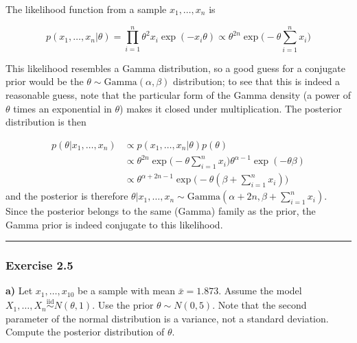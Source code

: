 \documentclass[
  letterpaper,
  DIV=11,
  numbers=noendperiod]{scrartcl}
\begin{document}
\begin{tcolorbox}[enhanced jigsaw, coltitle=black, breakable, colbacktitle=quarto-callout-note-color!10!white, colframe=quarto-callout-note-color-frame, bottomrule=.15mm, toprule=.15mm, rightrule=.15mm, arc=.35mm, colback=white, opacityback=0, bottomtitle=1mm, leftrule=.75mm, title={Solution}, titlerule=0mm, toptitle=1mm, left=2mm, opacitybacktitle=0.6]

The likelihood function from a sample \(x_1,\ldots,x_n\) is

\[
p(x_1,\ldots,x_n \vert \theta) = \prod_{i=1}^n\theta^2 x_i \exp (-x_i\theta) \propto \theta^{2n}\exp\Big(-\theta \sum_{i=1}^n x_i \Big)
\]

This likelihood resembles a Gamma distribution, so a good guess for a
conjugate prior would be the
\(\theta \sim \mathrm{Gamma}(\alpha,\beta)\) distribution; to see that
this is indeed a reasonable guess, note that the particular form of the
Gamma density (a power of \(\theta\) times an exponential in \(\theta\))
makes it closed under multiplication. The posterior distribution is then

\[
\begin{align}
p(\theta|x_1,\ldots,x_n) & \propto p(x_1,\ldots,x_n \vert \theta)p(\theta) \\
      & \propto \theta^{2n}\exp\Big(-\theta \sum_{i=1}^n x_i \Big)\theta^{\alpha-1}\exp(-\theta\beta) \\
      & \propto \theta^{\alpha + 2n - 1}\exp\Big(-\theta (\beta+\sum_{i=1}^n x_i) \Big)
\end{align}
\] and the posterior is therefore
\(\theta \vert x_1,\ldots,x_n \sim \mathrm{Gamma}(\alpha + 2n,\beta + \sum_{i=1}^n x_i)\).
Since the posterior belongs to the same (Gamma) family as the prior, the
Gamma prior is indeed conjugate to this likelihood.

\end{tcolorbox}

\begin{center}\rule{0.5\linewidth}{0.5pt}\end{center}

\subsubsection{Exercise 2.5}\label{exercise-2.5}

\textbf{a)} Let \(x_{1},\ldots,x_{10}\) be a sample with mean
\(\bar{x}=1.873\). Assume the model
\(X_1,\ldots,X_n \overset{\mathrm{iid}}{\sim} N(\theta,1)\). Use the
prior \(\theta \sim N(0,5)\). Note that the second parameter of the
normal distribution is a variance, not a standard deviation. Compute the
posterior distribution of \(\theta\).
\end{document}

